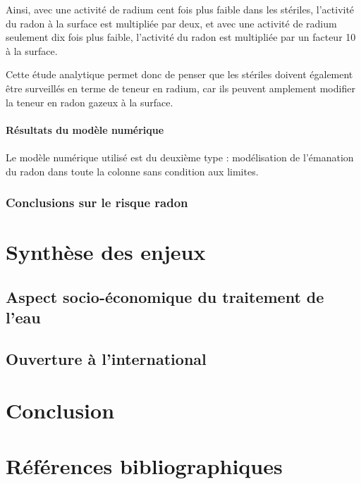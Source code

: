 \documentclass{article}
\begin{document}
Ainsi, avec une activité de radium cent fois plus faible dans les stériles, l'activité du radon à la surface est multipliée par deux, et avec une activité de radium seulement dix fois plus faible, l'activité du radon est multipliée par un facteur 10 à la surface.

Cette étude analytique permet donc de penser que les stériles doivent également être surveillés en terme de teneur en radium, car ils peuvent amplement modifier la teneur en radon gazeux à la surface.

\paragraph{Résultats du modèle numérique}
\paragraph{} Le modèle numérique utilisé est du deuxième type : modélisation de l'émanation du radon dans toute la colonne sans condition aux limites. 

\subsubsection{Conclusions sur le risque radon}

\newpage
\section{Synthèse des enjeux}
\subsection{Aspect socio-économique du traitement de l’eau}
\subsection{Ouverture à l’international}

\newpage
\section*{Conclusion}

\newpage
\section*{Références bibliographiques}

\printbibliography[heading=none] %
\end{document}
